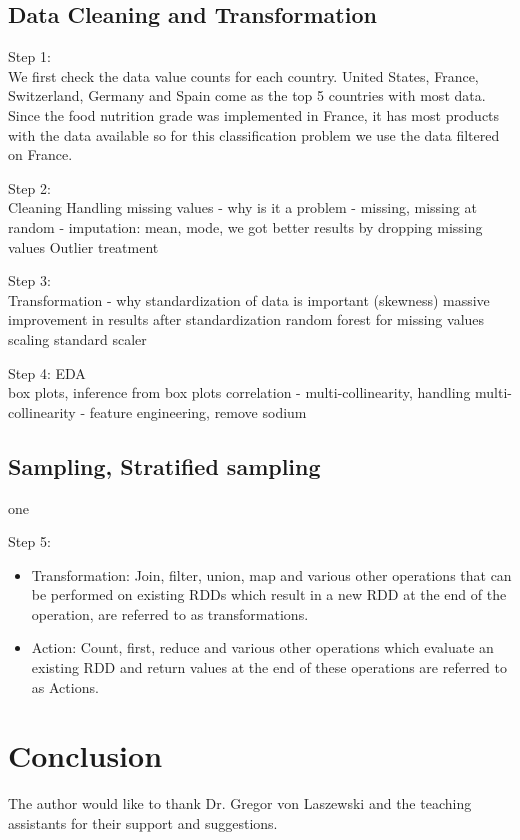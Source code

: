 \documentclass[sigconf]{acmart}
\begin{document}
\subsection{Data Cleaning and Transformation}
Step 1: \\
We first check the data value counts for each country. United States, France, Switzerland, Germany and Spain come as the top 5 countries with most data. Since the food nutrition grade was implemented in France, it has most products with the data available so for this classification problem we use the data filtered on France. 

Step 2: \\ Cleaning
Handling missing values
- why is it a problem
- missing, missing at random
- imputation: mean, mode,
we got better results by dropping missing values
Outlier treatment

Step 3: \\ Transformation
- why standardization of data is important (skewness)
massive improvement in results after standardization
random forest for missing values
scaling
standard scaler

Step 4: EDA \\
box plots, inference from box plots
correlation - multi-collinearity, 
handling multi-collinearity - feature engineering,
remove sodium


\subsection{Sampling, Stratified sampling} 
one


Step 5: \\
\begin{itemize}
	\item Transformation: Join, filter, union, map and various other operations that can be performed on existing RDDs which result in a new RDD at the end of the operation, are referred to as transformations.
	\item Action: Count, first, reduce and various other operations which evaluate an existing RDD and return values at the end of these operations are referred to as Actions.
\end{itemize}

\section{Conclusion}


\begin{acks}

The author would like to thank Dr. Gregor von Laszewski and the teaching assistants for their support and suggestions.

\end{acks}


 
\end{document}
